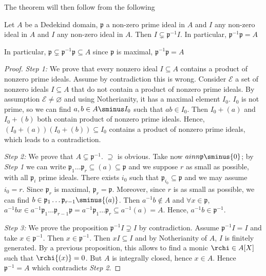 The theorem will then follow from the following 
\begin{proposition}{}
    Let \(A\) be a Dedekind domain, \(\mathfrak{p}\) a non-zero prime ideal in
    \(A\) and \(I\) any non-zero ideal in \(A\) and \(I\) any non-zero ideal in
    \(A\). Then \(I \subsetneq \mathfrak{p}^{-1} I \). In particular,
    \(\mathfrak{p}^{-1} \mathfrak{p} = A\) 
\end{proposition}
\begin{remark}{}
    In particular, \(\mathfrak{p} \subsetneq \mathfrak{p}^{-1} \mathfrak{p}
    \subseteq A  \) since \(\mathfrak{p}\) is maximal, \(\mathfrak{p}^{-1}
    \mathfrak{p} = A\) 
\end{remark}
\begin{proof}{}
    \emph{Step 1:}
    We prove that every nonzero ideal \(I \subseteq A \) contains a product of
    nonzero prime ideals. Assume by contradiction this is wrong. Consider
    \(\mathcal{E}\) a set of nonzero ideals \(I \subseteq A \) that do not
    contain a product of nonzero prime ideals.
    By assumption \(\mathcal{E} \neq \varnothing\) and using Notherianity, it
    has a maximal element \(I_{0}\). \(I_{0}\) is not prime, so we can find \(a,
    b \in A \sminus I_{0}\) such that \(ab \in I_{0}\). Then \(I_{0} + {(a)}\)
    and \(I_{0} + {(b)}\) both contain product of nonzero prime ideals.
    Hence, \({(I_{0} + {(a)})}{(I_{0} + {(b)})} \subseteq I_{0} \) contains a
    product of nonzero prime ideals, which leads to a contradiction.

    \emph{Step 2:} We prove that \(A \subsetneq \mathfrak{p}^{-1} \).
    \(\supseteq  \) is obvious. Take now \(a inn \mathfrak{p} \sminus \{0\} \);
    by \emph{Step 1} we can write \(\mathfrak{p}_1 \dots \mathfrak{p}_r
    \subseteq {(a)} \subseteq  \mathfrak{p} \) and we suppose \(r\) as small as
    possible, with all \(\mathfrak{p}_i\) prime ideals. There exists \(i_{0}\)
    such that \(\mathfrak{p}_{i_{0}} \subseteq \mathfrak{p} \) and we may assume
    \(i_{0} = r\). Since \(\mathfrak{p}_r\) is maximal, \(\mathfrak{p}_r =
    \mathfrak{p}\). Moreover, since \(r\) is as small as possible, we can find
    \(b \in  \mathfrak{p}_1 \dots \mathfrak{p}_{r-1} \sminus {(a)} \). Then
    \(a^{-1}b \not\in A\) and \(\forall x \in \mathfrak{p}\), \(a^{-1}b x \in
    a^{-1} \mathfrak{p}_1 \dots \mathfrak{p}_{r-1} \mathfrak{p} =
    a^{-1}\mathfrak{p}_1 \dots \mathfrak{p}_r \subseteq a^{-1} {(a)} =  A\).
    Hence, \(a^{-1}b \in  \mathfrak{p}^{-1}\).

    \emph{Step 3:} We prove the proposition \(\mathfrak{p}^{-1} I \supsetneq I
    \) by contradiction. Assume \(\mathfrak{p}^{-1} I = I\) and take \(x \in
    \mathfrak{p}^{-1}\). Then \(x \in \mathfrak{p}^{-1}\). Then \(xI \subseteq I
    \) and by Notherianity of \(A\), \(I\) is finitely generated. By a previous
    proposition, this allows to find a monic \(\rchi \in  A[X]\) such that
    \(\rchi {(x)} = 0\). But \(A\) is integrally closed, hence \(x \in A\).
    Hence \(\mathfrak{p}^{-1} = A\) which contradicts \emph{Step 2}.
\end{proof}

